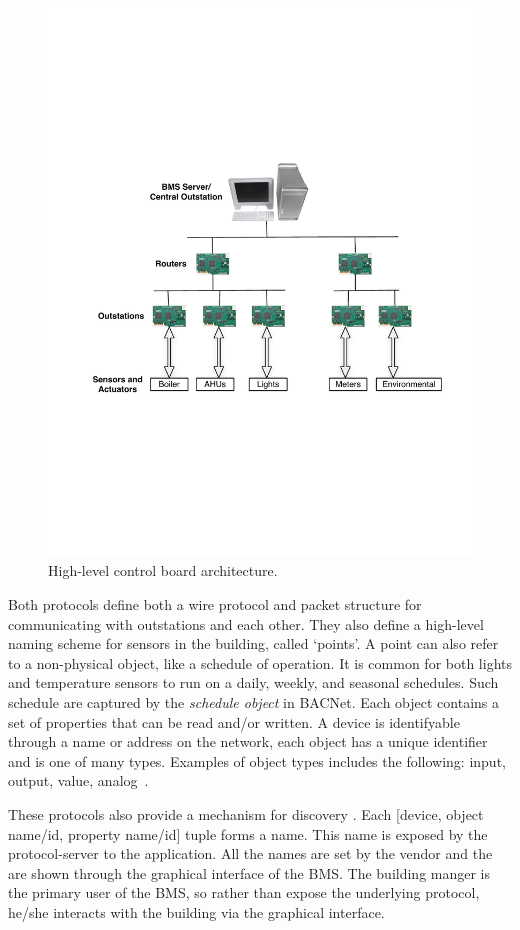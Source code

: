 \begin{figure}[h!] %
\centering
\includegraphics[width=0.50\columnwidth]{figs/BMS_network}
\caption{High-level control board architecture.}
\label{fig:bms_network}
\end{figure}

Both protocols define both a wire protocol and packet structure for communicating with outstations and each other.  They also define a high-level
naming scheme for sensors in the building, called `points'.  A point can also refer to a non-physical object, like a schedule of operation.
It is common for both lights and temperature sensors to run on a daily, weekly, and seasonal schedules.  Such schedule are captured
by the \emph{schedule object} in BACNet.  
Each object contains a set of properties that can 
be read and/or written.  A device is identifyable through a name or address on the network, each object has a unique identifier and is one of
many types.  Examples of object types includes the following: input, output, value, analog~\cite{Bacnet}.  

These protocols also provide a mechanism for discovery .  Each [device, object name/id, property name/id] tuple forms a name.
This name is exposed by the protocol-server to the application.  All the names are set by the vendor and the are shown through the graphical interface
of the BMS.  
The building manger is the primary user of the BMS,
so rather than expose the underlying protocol, he/she interacts with the building via the graphical interface.

